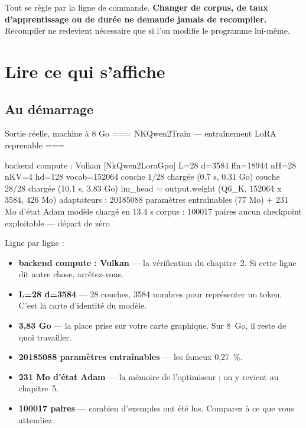 \begin{nkretenir}
Tout se règle par la ligne de commande. \textbf{Changer de corpus, de taux
d'apprentissage ou de durée ne demande jamais de recompiler.} Recompiler ne
redevient nécessaire que si l'on modifie le programme lui-même.
\end{nkretenir}

\section{Lire ce qui s'affiche}

\subsection{Au démarrage}

\begin{nkcode}[]{Sortie réelle, machine à 8 Go}
=== NKQwen2Train — entraînement LoRA reprenable ===

backend compute : Vulkan
  [NkQwen2LoraGpu] L=28 d=3584 ffn=18944 nH=28 nKV=4 hd=128 vocab=152064
    couche 1/28 chargée (0.7 s, 0.31 Go)
    couche 28/28 chargée (10.1 s, 3.83 Go)
    lm_head = output.weight (Q6_K, 152064 x 3584, 426 Mo)
    adaptateurs : 20185088 paramètres entraînables (77 Mo) + 231 Mo d'état Adam
modèle chargé en 13.4 s
corpus : 100017 paires
aucun checkpoint exploitable — départ de zéro
\end{nkcode}

Ligne par ligne :

\begin{itemize}
  \item \textbf{backend compute : Vulkan} — la vérification du chapitre~2. Si
        cette ligne dit autre chose, arrêtez-vous.
  \item \textbf{L=28 d=3584} — 28 couches, 3584 nombres pour représenter un
        token. C'est la carte d'identité du modèle.
  \item \textbf{3,83 Go} — la place prise sur votre carte graphique. Sur 8~Go,
        il reste de quoi travailler.
  \item \textbf{20185088 paramètres entraînables} — les fameux 0,27~\%.
  \item \textbf{231 Mo d'état Adam} — la mémoire de l'optimiseur ; on y revient
        au chapitre~5.
  \item \textbf{100017 paires} — combien d'exemples ont été lus. Comparez à ce
        que vous attendiez.
\end{itemize}

